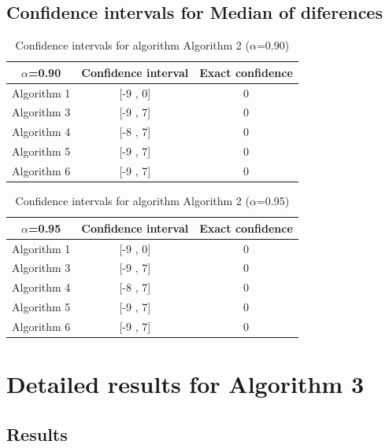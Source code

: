\documentclass[a4paper,10pt]{article}
\begin{document}
\subsection{Confidence intervals for Median of diferences}

\begin{table}[!htp]
\centering\small
\begin{tabular}{
|c|c|c|}
\hline
 $\alpha$=0.90 & Confidence interval & Exact confidence \\ \hline 
Algorithm 1 & [-9 , 0] & 0\\ \hline 
Algorithm 3 & [-9 , 7] & 0\\ \hline 
Algorithm 4 & [-8 , 7] & 0\\ \hline 
Algorithm 5 & [-9 , 7] & 0\\ \hline 
Algorithm 6 & [-9 , 7] & 0\\ \hline 

\end{tabular}
\caption{Confidence intervals for algorithm Algorithm 2 ($\alpha$=0.90)}
\end{table}
\begin{table}[!htp]
\centering\small
\begin{tabular}{
|c|c|c|}
\hline
 $\alpha$=0.95 & Confidence interval & Exact confidence \\ \hline 
Algorithm 1 & [-9 , 0] & 0\\ \hline 
Algorithm 3 & [-9 , 7] & 0\\ \hline 
Algorithm 4 & [-8 , 7] & 0\\ \hline 
Algorithm 5 & [-9 , 7] & 0\\ \hline 
Algorithm 6 & [-9 , 7] & 0\\ \hline 

\end{tabular}
\caption{Confidence intervals for algorithm Algorithm 2 ($\alpha$=0.95)}
\end{table}

 \clearpage 


\section{Detailed results for Algorithm 3}


\subsection{Results}
\end{document}
